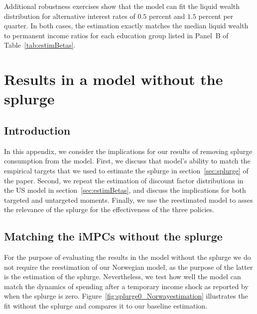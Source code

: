 \documentclass[qe]{econsocart}
\begin{document}
\appendix



Additional robustness exercises show that the model can fit the liquid wealth distribution for alternative interest rates of $0.5$ percent and $1.5$ percent per quarter. In both cases, the estimation exactly matches the median liquid wealth to permanent income ratios for each education group listed in Panel~B of Table~\ref{tab:estimBetas}.
\section{Results in a model without the splurge}
\label{app:Model-without-splurge} 

\subsection{Introduction}
\label{app:Model-without-splurge-intro} 

In this appendix, we consider the implications for our results of removing splurge consumption from the model. First, we discuss that model's ability to match the empirical targets that we used to estimate the splurge in section~\ref{sec:splurge} of the paper. Second, we repeat the estimation of discount factor distributions in the US model in section~\ref{sec:estimBetas}, and discuss the implications for both targeted and untargeted moments. Finally, we use the reestimated model to asses the relevance of the splurge for the effectiveness of the three policies.

\subsection{Matching the iMPCs without the splurge}
\label{app:nosplurge-matching-impcs} 

For the purpose of evaluating the results in the model without the splurge we do not require the reestimation of our Norwegian model, as the purpose of the latter is the estimation of the splurge. Nevertheless, we test how well the model can match the dynamics of spending after a temporary income shock as reported by~\cite{fagereng-mpc-2021} when the splurge is zero.
Figure~\ref{fig:splurge0_Norwayestimation} illustrates the fit without the splurge and compares it to our baseline estimation.
\end{document}
